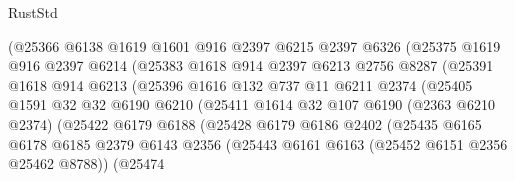 \begin{lexlean}{RustStd}
\begin{coremodule}
                          (@25366
                            @6138
                            @1619
                            @1601
                            @916
                            @2397
                            @6215
                            @2397
                            @6326
                            (@25375
                              @1619
                              @916
                              @2397
                              @6214
                              (@25383
                                @1618
                                @914
                                @2397
                                @6213
                                @2756
                                @8287
                                (@25391
                                  @1618
                                  @914
                                  @6213
                                  (@25396
                                    @1616
                                    @132
                                    @737
                                    @11
                                    @6211
                                    @2374
                                    (@25405
                                      @1591
                                      @32
                                      @32
                                      @6190
                                      @6210
                                      (@25411
                                        @1614
                                        @32
                                        @107
                                        @6190
                                        (@2363 @6210 @2374)
                                        (@25422
                                          @6179
                                          @6188
                                          (@25428
                                            @6179
                                            @6186
                                            @2402
                                            (@25435
                                              @6165
                                              @6178
                                              @6185
                                              @2379
                                              @6143
                                              @2356
                                              (@25443 @6161 @6163 (@25452 @6151 @2356 @25462 @8788))
                                              (@25474

\end{coremodule}
\end{lexlean}
